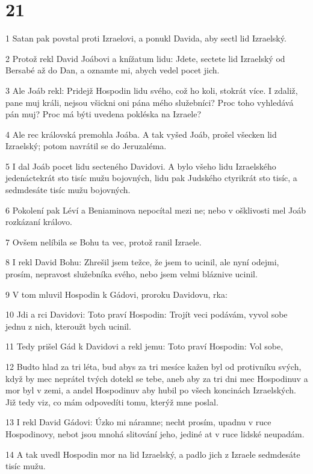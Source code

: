 \chapter{21}

\par 1 Satan pak povstal proti Izraelovi, a ponukl Davida, aby sectl lid Izraelský.
\par 2 Protož rekl David Joábovi a knížatum lidu: Jdete, sectete lid Izraelský od Bersabé až do Dan, a oznamte mi, abych vedel pocet jich.
\par 3 Ale Joáb rekl: Pridejž Hospodin lidu svého, což ho koli, stokrát více. I zdaliž, pane muj králi, nejsou všickni oni pána mého služebníci? Proc toho vyhledává pán muj? Proc má býti uvedena pokléska na Izraele?
\par 4 Ale rec královská premohla Joába. A tak vyšed Joáb, prošel všecken lid Izraelský; potom navrátil se do Jeruzaléma.
\par 5 I dal Joáb pocet lidu secteného Davidovi. A bylo všeho lidu Izraelského jedenáctekrát sto tisíc mužu bojovných, lidu pak Judského ctyrikrát sto tisíc, a sedmdesáte tisíc mužu bojovných.
\par 6 Pokolení pak Léví a Beniaminova nepocítal mezi ne; nebo v ošklivosti mel Joáb rozkázaní královo.
\par 7 Ovšem nelíbila se Bohu ta vec, protož ranil Izraele.
\par 8 I rekl David Bohu: Zhrešil jsem težce, že jsem to ucinil, ale nyní odejmi, prosím, nepravost služebníka svého, nebo jsem velmi bláznive ucinil.
\par 9 V tom mluvil Hospodin k Gádovi, proroku Davidovu, rka:
\par 10 Jdi a rci Davidovi: Toto praví Hospodin: Trojít veci podávám, vyvol sobe jednu z nich, kteroužt bych ucinil.
\par 11 Tedy prišel Gád k Davidovi a rekl jemu: Toto praví Hospodin: Vol sobe,
\par 12 Budto hlad za tri léta, bud abys za tri mesíce kažen byl od protivníku svých, když by mec neprátel tvých dotekl se tebe, aneb aby za tri dni mec Hospodinuv a mor byl v zemi, a andel Hospodinuv aby hubil po všech koncinách Izraelských. Již tedy viz, co mám odpovedíti tomu, kterýž mne poslal.
\par 13 I rekl David Gádovi: Úzko mi náramne; necht prosím, upadnu v ruce Hospodinovy, nebot jsou mnohá slitování jeho, jediné at v ruce lidské neupadám.
\par 14 A tak uvedl Hospodin mor na lid Izraelský, a padlo jich z Izraele sedmdesáte tisíc mužu.
